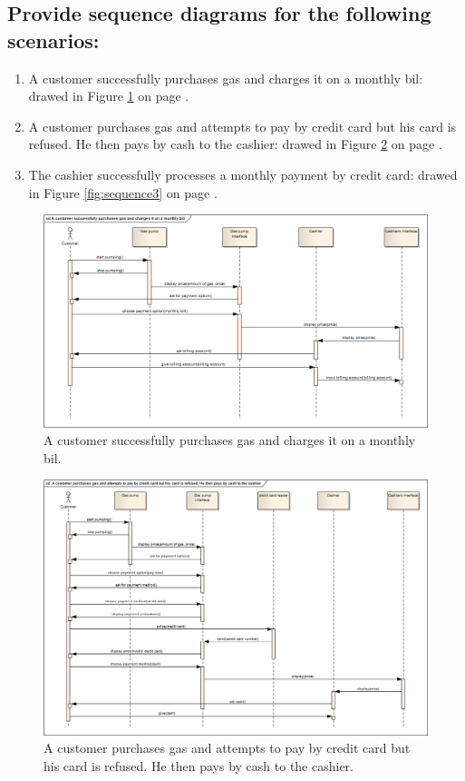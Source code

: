 \documentclass[11pt,a4paper]{article}
\begin{document}
\subsection*{Provide sequence diagrams for the following scenarios:}
\begin{enumerate}
	\item A customer successfully purchases gas and charges it on a monthly bil: drawed in Figure \ref{fig:sequence1} on page \pageref{fig:sequence1}.
	\item A customer purchases gas and attempts to pay by credit card but his card is refused. He then pays by cash to the cashier: drawed in Figure \ref{fig:sequence2} on page \pageref{fig:sequence2}.
	\item The cashier successfully processes a monthly payment by credit card: drawed in Figure \ref{fig:sequence3} on page \pageref{fig:sequence3}.
\end{enumerate}

\begin{figure}[H]
 \centering
 \includegraphics[width=\textwidth]{../sequence1.png} 
 \caption{A customer successfully purchases gas and charges it on a monthly bil.}
 \label{fig:sequence1}
\end{figure}

\begin{figure}[H]
 \centering
 \includegraphics[width=\textwidth]{../sequence2.png} 
 \caption{A customer purchases gas and attempts to pay by credit card but his card is refused. He then pays by cash to the cashier.}
 \label{fig:sequence2}
\end{figure}
\end{document}
